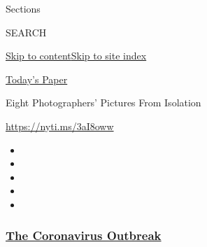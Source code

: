 Sections

SEARCH

\protect\hyperlink{site-content}{Skip to
content}\protect\hyperlink{site-index}{Skip to site index}

\href{https://myaccount.nytimes3xbfgragh.onion/auth/login?response_type=cookie\&client_id=vi}{}

\href{https://www.nytimes3xbfgragh.onion/section/todayspaper}{Today's
Paper}

Eight Photographers' Pictures From Isolation

\url{https://nyti.ms/3aI8oww}

\begin{itemize}
\item
\item
\item
\item
\item
\end{itemize}

\hypertarget{the-coronavirus-outbreak}{%
\subsubsection{\texorpdfstring{\href{https://www.nytimes3xbfgragh.onion/news-event/coronavirus?name=styln-coronavirus-national\&region=TOP_BANNER\&block=storyline_menu_recirc\&action=click\&pgtype=Article\&impression_id=f7604420-f278-11ea-9a9f-018759a6103d\&variant=undefined}{The
Coronavirus
Outbreak}}{The Coronavirus Outbreak}}\label{the-coronavirus-outbreak}}

